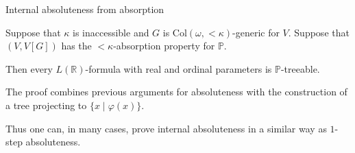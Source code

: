 \documentclass[handout, dvipsnames, usenames, 9pt, serif]{beamer}
\newcommand{\PP}{\mathbb{P}}
\newcommand{\RR}{\mathbb{R}}
\newcommand{\Coll}{\mathrm{Col}}
\begin{document}
\begin{frame}{Internal absoluteness from absorption} 

\begin{lemma}[M\"uller, S.] 
Suppose that $\kappa$ is inaccessible and $G$ is $\Coll(\omega,{<}\kappa)$-generic for $V$. 
Suppose that $(V,V[G])$ has the ${<}\kappa$-absorption property for $\PP$. 

\medskip 
Then every $L(\RR)$-formula with real and ordinal parameters is $\PP$-treeable. 
\end{lemma} 
\pause  

\medskip 
The proof combines previous arguments for absoluteness with the construction of a tree projecting to $\{x\mid \varphi(x)\}$. 

\medskip 
Thus one can, in many cases, prove internal absoluteness in a similar way as $1$-step absoluteness. 

\end{frame}
\end{document}
